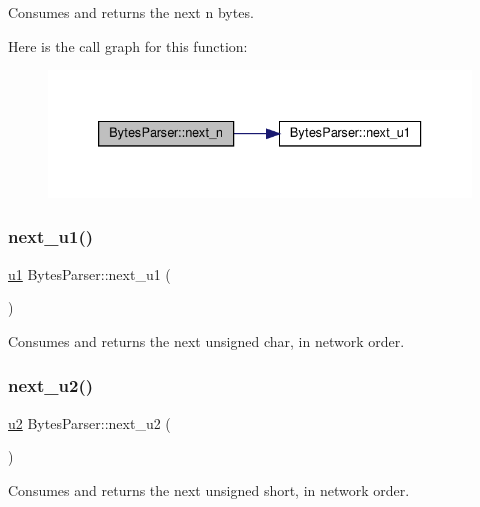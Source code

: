 Consumes and returns the next {\ttfamily n} bytes. 

Here is the call graph for this function\+:
\nopagebreak
\begin{figure}[H]
\begin{center}
\leavevmode
\includegraphics[width=333pt]{classBytesParser_acb95ccefd93aa90ae9c74aaec13b497e_cgraph}
\end{center}
\end{figure}
\mbox{\label{classBytesParser_a18a5ff71458418a33c99d301ecc37579}} 
\subsubsection{\texorpdfstring{next\+\_\+u1()}{next\_u1()}}
{\footnotesize\ttfamily \hyperlink{types_8h_a162f47a77ee24f6f77cd8c82ccd40ab7}{u1} Bytes\+Parser\+::next\+\_\+u1 (\begin{DoxyParamCaption}{ }\end{DoxyParamCaption})}



Consumes and returns the next unsigned char, in network order. 

\mbox{\label{classBytesParser_a8c1d8a37eabff268351e38706a78ce2a}} 
\subsubsection{\texorpdfstring{next\+\_\+u2()}{next\_u2()}}
{\footnotesize\ttfamily \hyperlink{types_8h_ae676e9207f57fb921dca7366b2f59c53}{u2} Bytes\+Parser\+::next\+\_\+u2 (\begin{DoxyParamCaption}{ }\end{DoxyParamCaption})}



Consumes and returns the next unsigned short, in network order. 

